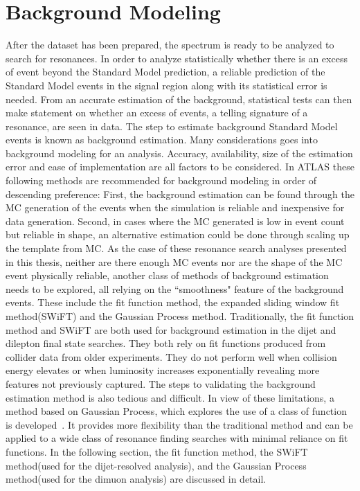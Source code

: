 \section{Background Modeling}
\label{section:backgroundest}
After the dataset has been prepared, the spectrum is ready to be analyzed to search for resonances. In order to analyze statistically whether there is an excess of event beyond the Standard Model prediction, a reliable prediction of the Standard Model events in the signal region along with its statistical error is needed. From an accurate estimation of the background, statistical tests can then make statement on whether an excess of events, a telling signature of a resonance, are seen in data.
The step to estimate background Standard Model events is known as background estimation.
    Many considerations goes into background modeling for an analysis. Accuracy, availability, size of the estimation error and ease of implementation are all factors to be considered. In ATLAS these following methods are recommended for background modeling in order of descending preference:
    First, the background estimation can be found through the MC generation of the events when the simulation is reliable and inexpensive for data generation. Second, in cases where the MC generated is low in event count but reliable in shape, an alternative estimation could be done through scaling up the template from MC. As the case of these resonance search analyses presented in this thesis, neither are there enough MC events nor are the shape of the MC event physically reliable, another class of methods of background estimation needs to be explored, all relying on the ``smoothness" feature of the background events. These include the fit function method, the expanded sliding window fit method(SWiFT) and the Gaussian Process method.
    Traditionally, the fit function method and SWiFT are both used for background estimation in the dijet and dilepton final state searches. They both rely on fit functions produced from collider data from older experiments. They do not perform well when collision energy elevates or when luminosity increases exponentially revealing more features not previously captured. The steps to validating the background estimation method is also tedious and difficult.
    In view of these limitations, a method based on Gaussian Process, which explores the use of a class of function is developed~\cite{frate2017modeling}. It provides more flexibility than the traditional method and can be applied to a wide class of resonance finding searches with minimal reliance on fit functions. 
    In the following section, the fit function method, the SWiFT method(used for the dijet-resolved analysis), and the Gaussian Process method(used for the dimuon analysis) are discussed in detail. 

